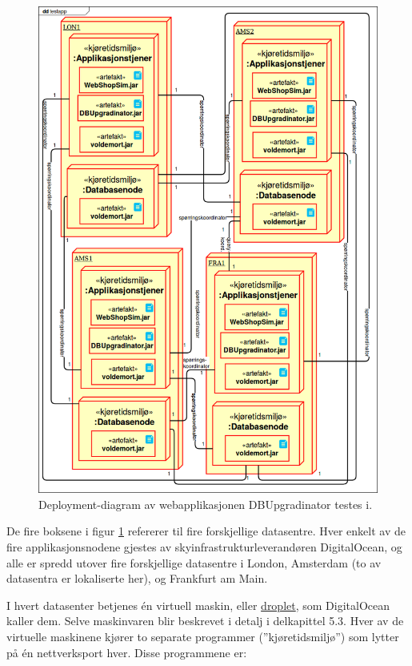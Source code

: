 \begin{figure}[hbtp]
  \centering
  \includegraphics[scale=0.5]{fig/dbupgradinator-physical.png}
  \caption{Deployment-diagram av webapplikasjonen DBUpgradinator testes i.}
  \label{fig10}
\end{figure}

De fire boksene i figur \ref{fig10} refererer til fire forskjellige datasentre. Hver enkelt av de fire applikasjonsnodene gjestes av skyinfrastrukturleverandøren DigitalOcean, og alle er spredd utover fire forskjellige datasentre i London, Amsterdam (to av datasentra er lokaliserte her), og Frankfurt am Main.

I hvert datasenter betjenes én virtuell maskin, eller \underline{droplet}, som DigitalOcean kaller dem. Selve maskinvaren blir beskrevet i detalj i delkapittel 5.3. Hver av de virtuelle maskinene kjører to separate programmer (''kjøretidsmiljø'') som lytter på én nettverksport hver. Disse programmene er:

